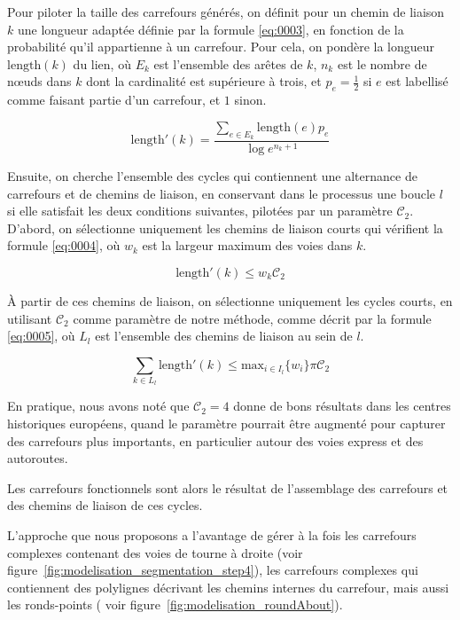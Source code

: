 Pour piloter la taille des carrefours générés, on définit pour un chemin de liaison $k$ une longueur adaptée définie par la formule \ref{eq:0003}, en fonction de la probabilité qu'il appartienne à un carrefour. Pour cela, on pondère la longueur $\mathrm{length}(k)$ du lien, où $E_k$ est l'ensemble des arêtes de $k$, $n_k$ est le nombre de nœuds dans $k$ dont la cardinalité est supérieure à trois, et $p_e=\frac{1}{2}$ si $e$ est labellisé comme faisant partie d'un carrefour, et $1$ sinon.

\begin{equation}
 \mathrm{length}'(k) = \frac{\sum_{e \in E_k}\mathrm{length}(e) p_e}{\log e^{n_k +1}}
 \label{eq:0003}
\end{equation}

Ensuite, on cherche l'ensemble des cycles qui contiennent une alternance de carrefours et de chemins de liaison, en conservant dans le processus une boucle $l$ si elle satisfait les deux conditions suivantes, pilotées par un paramètre $\mathcal{C}_2$.
D'abord, on sélectionne uniquement les chemins de liaison courts qui vérifient la formule \ref{eq:0004}, où $w_k$ est la largeur maximum des voies dans $k$.

\begin{equation}
\mathrm{length}'(k) \leq w_k \mathcal{C}_2
\label{eq:0004}
\end{equation}

À partir de ces chemins de liaison, on sélectionne uniquement les cycles courts, en utilisant $\mathcal{C}_2$ comme paramètre de notre méthode, comme décrit par la formule \ref{eq:0005}, où $L_l$ est l'ensemble des chemins de liaison au sein de $l$.

\begin{equation}
\sum_{k \in L_l} \mathrm{length}'(k) \leq \mathrm{max}_{i \in I_l}\{w_i\} \pi \mathcal{C}_2
\label{eq:0005}
\end{equation}

En pratique, nous avons noté que $\mathcal{C}_2=4$ donne de bons résultats dans les centres historiques européens, quand le paramètre pourrait être augmenté pour capturer des carrefours plus importants, en particulier autour des voies express et des autoroutes.

\newpar{}

Les carrefours fonctionnels sont alors le résultat de l'assemblage des carrefours et des chemins de liaison de ces cycles.

\newpar{}

L'approche que nous proposons a l'avantage de gérer à la fois les carrefours complexes contenant des voies de tourne à droite (voir figure~\ref{fig:modelisation_segmentation_step4}), les carrefours complexes qui contiennent des polylignes décrivant les chemins internes du carrefour, mais aussi les ronds-points ( voir figure~\ref{fig:modelisation_roundAbout}).

